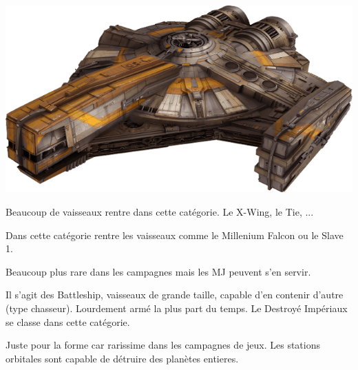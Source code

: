 \begin{center}
    \includegraphics[width=0.9\linewidth]{img/equipement/navette.png}
\end{center}

\begin{description}[align=left]
    \item [Chasseur léger]
        Beaucoup de vaisseaux rentre dans cette catégorie. Le X-Wing, le Tie, ...

    \item [Navette]
        Dans cette catégorie rentre les vaisseaux comme le Millenium Falcon ou le Slave 1.

    \item [Croiseur]
        Beaucoup plus rare dans les campagnes mais les MJ peuvent s'en servir.

    \item [Batiment]
        Il s'agit des Battleship, vaisseaux de grande taille, capable d'en contenir d'autre (type chasseur). Lourdement armé la plus part du temps. Le Destroyé Impériaux se classe dans cette catégorie.

    \item [Station Orbitale]
        Juste pour la forme car rarissime dans les campagnes de jeux. Les stations orbitales sont capable de détruire des planètes entieres.
\end{description}


